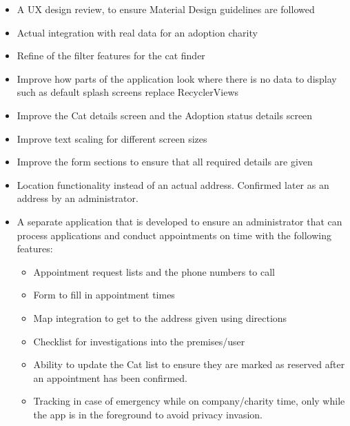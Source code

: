 \begin{itemize}
    \item A UX design review, to ensure Material Design guidelines are followed
    \item Actual integration with real data for an adoption charity
    \item Refine of the filter features for the cat finder
    \item Improve how parts of the application look where there is no data to display such as default splash screens replace RecyclerViews
    \item Improve the Cat details screen and the Adoption status details screen
    \item Improve text scaling for different screen sizes
    \item Improve the form sections to ensure that all required details are given
    \item Location functionality instead of an actual address. Confirmed later as an address by an administrator.
    \item A separate application that is developed to ensure an administrator that can process applications and conduct appointments on time with the following features:
    \begin{itemize}
        \item Appointment request lists and the phone numbers to call
        \item Form to fill in appointment times
        \item Map integration to get to the address given using directions
        \item Checklist for investigations into the premises/user
        \item Ability to update the Cat list to ensure they are marked as reserved after an appointment has been confirmed.
        \item Tracking in case of emergency while on company/charity time, only while the app is in the foreground to avoid privacy invasion.
    \end{itemize}
\end{itemize}